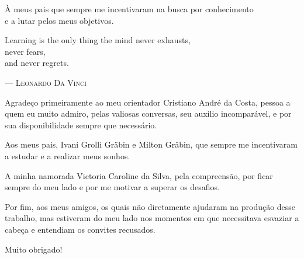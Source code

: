 \documentclass[english,brazilian]{UNISINOSmonografia}
\begin{document}
\capa
\folhaderosto

\begin{dedicatoria}
À meus pais que sempre me incentivaram na busca por conhecimento \\e a lutar pelos meus objetivos.\\[4ex] %

\begin{itshape} %
Learning is the only thing the mind never exhausts, \\
never fears, \\
and never regrets.\\
\end{itshape}
--- \textsc{Leonardo Da Vinci} %
\end{dedicatoria}

\begin{agradecimentos}
Agradeço primeiramente ao meu orientador Cristiano André da Costa, pessoa a quem eu muito admiro, pelas valiosas conversas, seu auxilio incomparável, e por sua disponibilidade sempre que necessário.

Aos meus pais, Ivani Grolli Gräbin e Milton Gräbin, que sempre me incentivaram a estudar e a realizar meus sonhos.

A minha namorada Victoria Caroline da Silva, pela compreensão, por ficar sempre do meu lado e por me motivar a superar os desafios.

Por fim, aos meus amigos, os quais não diretamente ajudaram na produção desse trabalho, mas estiveram do meu lado nos momentos em que necessitava esvaziar a cabeça e entendiam os convites recusados.

Muito obrigado!
\end{agradecimentos}

%
\end{document}
